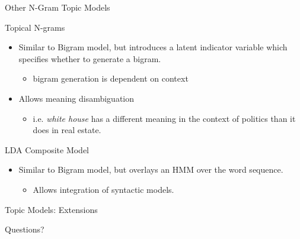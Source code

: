 \documentclass[10pt, svgnames]{beamer}
\begin{document}
\begin{frame}{Other N-Gram Topic Models}
	\begin{block}{Topical N-grams \cite{tng}}
		\begin{itemize}
			\item Similar to Bigram model, but introduces a latent indicator
				variable which specifies whether to generate a bigram.
				\begin{itemize}
					\item bigram generation is dependent on context
				\end{itemize}
			\item Allows meaning disambiguation
				\begin{itemize}
					\item i.e. \textit{white house} has a different meaning in the
						context of politics than it does in real estate.
				\end{itemize}
		\end{itemize}
	\end{block}
	\begin{block}{LDA Composite Model \cite{ldacol}}
		\begin{itemize}
			\item Similar to Bigram model, but overlays an HMM over the word
				sequence.
				\begin{itemize}
					\item Allows integration of syntactic models.
				\end{itemize}
		\end{itemize}
	\end{block}
\end{frame}

\begin{frame}{Topic Models: Extensions}
	\begin{center}Questions?\end{center}
\end{frame}
\end{document}
